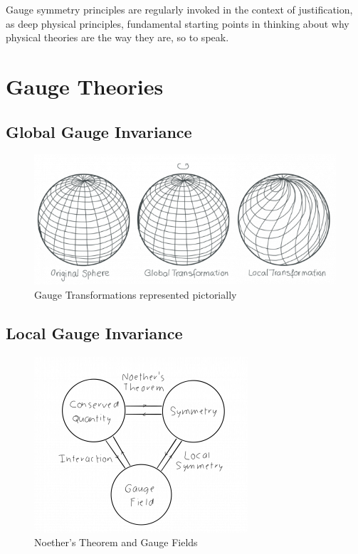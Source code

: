 \begin{savequote}[45mm]
Gauge symmetry principles are regularly invoked in the context of justification, as deep physical principles, fundamental starting points in thinking about why physical theories are the way they are, so to speak.  
\end{savequote}
\chapter{Gauge Theories}
\section{Global Gauge Invariance}

 \begin{figure}[h!]
    \centering
    \includegraphics{Figures/localtransformations.png}
    \caption{Gauge Transformations represented pictorially}
    \label{fig:my_label}
\end{figure}

\section{Local Gauge Invariance}

 \begin{figure}
    \centering
    \includegraphics{Figures/gaugetheornoether.png}
    \caption{Noether's Theorem and Gauge Fields}
    \label{fig:my_label}
\end{figure}

